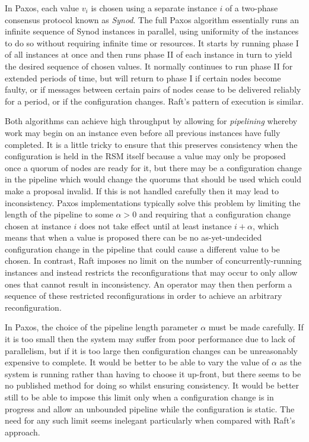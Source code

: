 \documentclass[journal]{IEEEtran}
\begin{document}
In Paxos, each value $v_i$ is chosen using a separate instance $i$ of a
two-phase consensus protocol known as \textit{Synod}. The full Paxos algorithm
essentially runs an infinite sequence of Synod instances in parallel, using
uniformity of the instances to do so without requiring infinite time or
resources.  It starts by running phase I of all instances at once and then runs
phase II of each instance in turn to yield the desired sequence of chosen
values. It normally continues to run phase II for extended periods of time, but
will return to phase I if certain nodes become faulty, or if messages between
certain pairs of nodes cease to be delivered reliably for a period, or if the
configuration changes.  Raft's pattern of execution is similar.

Both algorithms can achieve high throughput by allowing for \textit{pipelining}
\cite{smart} whereby work may begin on an instance even before all previous
instances have fully completed. It is a little tricky to ensure that this
preserves consistency when the configuration is held in the RSM itself because
a value may only be proposed once a quorum of nodes are ready for it, but there
may be a configuration change in the pipeline which would change the quorums
that should be used which could make a proposal invalid. If this is not handled
carefully then it may lead to inconsistency. Paxos implementations typically
solve this problem by limiting the length of the pipeline to some $\alpha > 0$
and requiring that a configuration change chosen at instance $i$ does not take
effect until at least instance $i + \alpha$, which means that when a value is
proposed there can be no as-yet-undecided configuration change in the pipeline
that could cause a different value to be chosen. In contrast, Raft imposes no
limit on the number of concurrently-running instances and instead restricts the
reconfigurations that may occur to only allow ones that cannot result in
inconsistency. An operator may then then perform a sequence of these restricted
reconfigurations in order to achieve an arbitrary reconfiguration.

In Paxos, the choice of the pipeline length parameter $\alpha$ must be made
carefully. If it is too small then the system may suffer from poor performance
due to lack of parallelism, but if it is too large then configuration changes
can be unreasonably expensive to complete. It would be better to be able to
vary the value of $\alpha$ as the system is running rather than having to
choose it up-front, but there seems to be no published method for doing so
whilst ensuring consistency. It would be better still to be able to impose this
limit only when a configuration change is in progress and allow an unbounded
pipeline while the configuration is static. The need for any such limit seems
inelegant\cite{reconfiguring-a-state-machine} particularly when compared with
Raft's approach.
\end{document}
